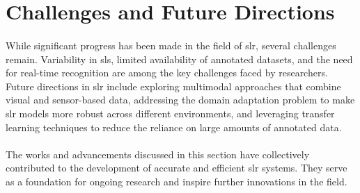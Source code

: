 \section{Challenges and Future Directions}
\paragraph{}
While significant progress has been made in the field of \ac{slr}, several challenges remain. Variability in \ac{sl}s, limited availability of annotated datasets, and the need for real-time recognition are among the key challenges faced by researchers. Future directions in \ac{slr} include exploring multimodal approaches that combine visual and sensor-based data, addressing the domain adaptation problem to make \ac{slr} models more robust across different environments, and leveraging transfer learning techniques to reduce the reliance on large amounts of annotated data.
\paragraph{}
The works and advancements discussed in this section have collectively contributed to the development of accurate and efficient \ac{slr} systems. They serve as a foundation for ongoing research and inspire further innovations in the field.

